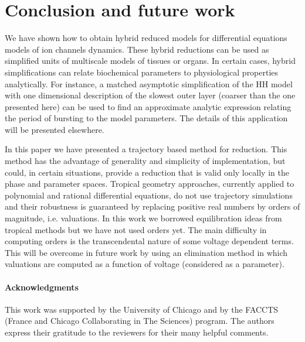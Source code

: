 \documentclass{llncs}
\begin{document}
\section{Conclusion and future work}
We have shown how to obtain hybrid reduced models for differential equations models of
ion channels dynamics. These hybrid reductions can be used as simplified units of
multiscale models of tissues or organs. In certain cases, hybrid simplifications
can relate biochemical parameters to physiological properties analytically.
For instance, a matched asymptotic simplification of the HH model with
one dimensional description of the slowest outer layer (coarser than the one presented here)
can be used to find an approximate analytic expression relating the period of bursting to
the model parameters. The details of this application will be presented elsewhere.

In this paper we have presented a trajectory based method for reduction. This method has the
advantage of generality and simplicity of implementation, but could, in certain situations,
provide a reduction that is valid only locally in the phase and parameter spaces.
Tropical geometry approaches, currently applied to
polynomial and rational differential equations, do not use trajectory simulations
and their robustness is guaranteed by replacing positive real numbers by orders
of magnitude, i.e. valuations. In this work we borrowed equilibration ideas from tropical methods
but we have not used orders yet. The main difficulty in computing orders
 is the transcendental nature of some voltage dependent terms.
 This will be overcome in future work by using an elimination method in which
valuations are computed as a function of voltage (considered as a parameter).

















\paragraph{Acknowledgments}
This work was supported by the University of Chicago and by the FACCTS (France
and Chicago Collaborating in The Sciences) program.  The authors express their
gratitude to the reviewers for their many helpful comments.
\end{document}
